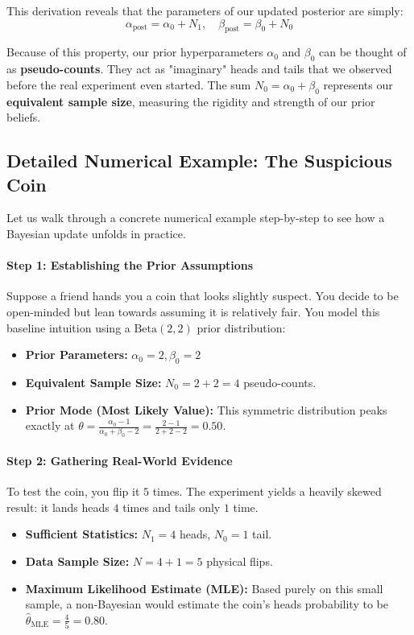 \documentclass{article}
\begin{document}
This derivation reveals that the parameters of our updated posterior are simply:
\begin{equation}
\alpha_{\text{post}} = \alpha_0 + N_1, \quad \beta_{\text{post}} = \beta_0 + N_0
\end{equation}

Because of this property, our prior hyperparameters $\alpha_0$ and $\beta_0$ can be thought of as \textbf{pseudo-counts}. They act as "imaginary" heads and tails that we observed before the real experiment even started. The sum $N_0 = \alpha_0 + \beta_0$ represents our \textbf{equivalent sample size}, measuring the rigidity and strength of our prior beliefs.

\subsection{Detailed Numerical Example: The Suspicious Coin}

Let us walk through a concrete numerical example step-by-step to see how a Bayesian update unfolds in practice.

\paragraph{Step 1: Establishing the Prior Assumptions}
Suppose a friend hands you a coin that looks slightly suspect. You decide to be open-minded but lean towards assuming it is relatively fair. You model this baseline intuition using a $\text{Beta}(2, 2)$ prior distribution:
\begin{itemize}
    \item \textbf{Prior Parameters:} $\alpha_0 = 2, \beta_0 = 2$
    \item \textbf{Equivalent Sample Size:} $N_0 = 2 + 2 = 4$ pseudo-counts.
    \item \textbf{Prior Mode (Most Likely Value):} This symmetric distribution peaks exactly at $\theta = \frac{\alpha_0 - 1}{\alpha_0 + \beta_0 - 2} = \frac{2-1}{2+2-2} = 0.50$.
\end{itemize}

\paragraph{Step 2: Gathering Real-World Evidence}
To test the coin, you flip it $5$ times. The experiment yields a heavily skewed result: it lands heads $4$ times and tails only $1$ time.
\begin{itemize}
    \item \textbf{Sufficient Statistics:} $N_1 = 4$ heads, $N_0 = 1$ tail.
    \item \textbf{Data Sample Size:} $N = 4 + 1 = 5$ physical flips.
    \item \textbf{Maximum Likelihood Estimate (MLE):} Based purely on this small sample, a non-Bayesian would estimate the coin's heads probability to be $\hat{\theta}_{\text{MLE}} = \frac{4}{5} = 0.80$.
\end{itemize}
\end{document}
